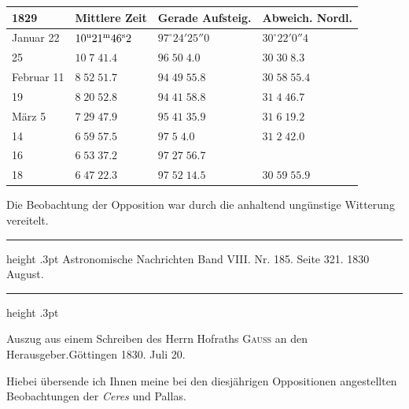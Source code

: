 \begin{center}
\begin{tabular}{l|l|l|l}
1829 & Mittlere Zeit & Gerade Aufsteig. & Abweich. Nordl. \\
\hline
Januar 22 & $10^{\rm u}21^{\rm m}46^{\rm s}2$ & $97^\circ24'25''0$ & $30^\circ22'0''4$ \\
\hfill 25 & $10\;7\;41.4$ & $96\;50\;4.0$ & $30\;30\;8.3$ \\
Februar 11 & $8\;52\;51.7$ & $94\;49\;55.8$ & $30\;58\;55.4$ \\
\hfill 19 & $8\;20\;52.8$ & $94\;41\;58.8$ & $31\;4\;46.7$ \\
März 5 & $7\;29\;47.9$ & $95\;41\;35.9$ & $31\;6\;19.2$ \\
\hfill 14 & $6\;59\;57.5$ & $97\;5\;4.0$ & $31\;2\;42.0$ \\
\hfill 16 & $6\;53\;37.2$ & $97\;27\;56.7$ & \\
\hfill 18 & $6\;47\;22.3$ & $97\;52\;14.5$ & $30\;59\;55.9$ \\
\end{tabular}
\end{center}

Die Beobachtung der Opposition war durch die anhaltend ungünstige Witterung vereitelt.

\par\bigskip
{}
\hypertarget{native-467-letter}{}
\begin{center}
\parbox{.72\linewidth}{%
\centering\small
\hrule height .3pt\relax\vspace{2.5pt}
Astronomische Nachrichten Band VIII. Nr. 185. Seite 321. 1830 August.\par
\vspace{2.5pt}\hrule height .3pt\relax
}
\end{center}

\begin{center}Auszug aus einem Schreiben des Herrn Hofraths \textsc{Gauss} an den Herausgeber.\quad Göttingen 1830. Juli 20.\end{center}

Hiebei übersende ich Ihnen meine bei den diesjährigen Oppositionen angestellten Beobachtungen der \emph{Ceres} und Pallas.

